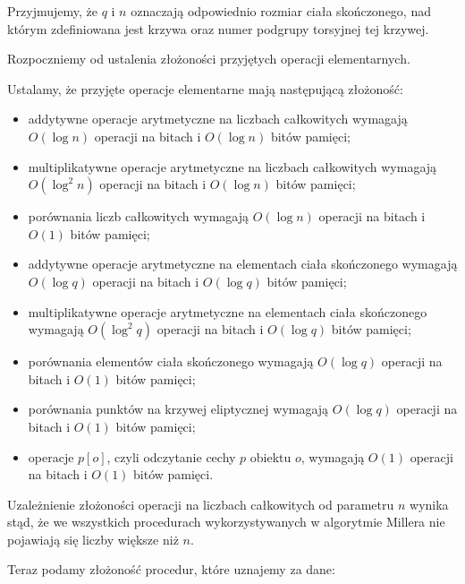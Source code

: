 \begin{remark}
Przyjmujemy, że $q$ i $n$ oznaczają odpowiednio
rozmiar ciała skończonego, nad którym zdefiniowana jest krzywa
oraz numer podgrupy torsyjnej tej krzywej.
\end{remark}

Rozpoczniemy od ustalenia złożoności przyjętych operacji elementarnych.

\begin{remark}
Ustalamy, że przyjęte operacje elementarne mają następującą złożoność:
\begin{itemize}
\item
addytywne operacje arytmetyczne na liczbach całkowitych wymagają
$O(\log n)$ operacji na bitach i $O(\log n)$ bitów pamięci;
\item
multiplikatywne operacje arytmetyczne na liczbach całkowitych wymagają
$O(\log^2 n)$ operacji na bitach i $O(\log n)$ bitów pamięci;
\item
porównania liczb całkowitych wymagają
$O(\log n)$ operacji na bitach i $O(1)$ bitów pamięci;
\item
addytywne operacje arytmetyczne na elementach ciała skończonego wymagają
$O(\log q)$ operacji na bitach i $O(\log q)$ bitów pamięci;
\item
multiplikatywne operacje arytmetyczne na elementach ciała skończonego wymagają
$O(\log^2 q)$ operacji na bitach i $O(\log q)$ bitów pamięci;
\item
porównania elementów ciała skończonego wymagają
$O(\log q)$ operacji na bitach i $O(1)$ bitów pamięci;
\item
porównania punktów na krzywej eliptycznej wymagają
$O(\log q)$ operacji na bitach i $O(1)$ bitów pamięci;
\item
operacje $p[o]$, czyli odczytanie cechy $p$ obiektu $o$, wymagają
$O(1)$ operacji na bitach i $O(1)$ bitów pamięci.
\end{itemize}
\end{remark}

\begin{remark}
Uzależnienie złożoności operacji na liczbach całkowitych od parametru $n$
wynika stąd,
że we wszystkich procedurach wykorzystywanych w algorytmie Millera
nie pojawiają się liczby większe niż $n$.
\end{remark}

Teraz podamy złożoność procedur, które uznajemy za dane:

